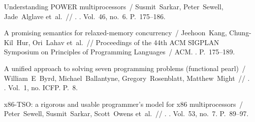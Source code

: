 \begin{thebibliography}{99}
Understanding POWER multiprocessors~/ Susmit~Sarkar, Peter~Sewell, Jade~Alglave
  et~al.~// . \BibDash
{}. \BibDash
\newblock Vol.~46, no.~6. \BibDash
\newblock P.~175--186.

A promising semantics for relaxed-memory concurrency~/ Jeehoon~Kang,
  Chung-Kil~Hur, Ori~Lahav et~al.~// Proceedings of the 44th ACM SIGPLAN
  Symposium on Principles of Programming Languages~/ ACM. \BibDash
{}. \BibDash
\newblock P.~175--189.

A unified approach to solving seven programming problems (functional pearl)~/
  William~E~Byrd, Michael~Ballantyne, Gregory~Rosenblatt, Matthew~Might~//
  . \BibDash
{}. \BibDash
\newblock Vol.~1, no. ICFP. \BibDash
\newblock P.~8.

x86-TSO: a rigorous and usable programmer's model for x86 multiprocessors~/
  Peter~Sewell, Susmit~Sarkar, Scott~Owens et~al.~// . \BibDash
{}. \BibDash
\newblock Vol.~53, no.~7. \BibDash
\newblock P.~89--97.


  
\end{thebibliography}
  
